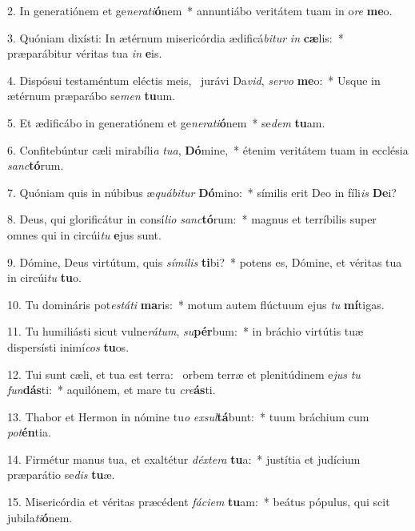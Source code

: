 2. In generatiónem et ge\textit{ne}\textit{ra}\textit{ti}\textbf{ó}nem~*  annuntiábo veritátem tuam in o\textit{re} \textbf{me}o.\

3. Quóniam dixísti: In ætérnum misericórdia ædificá\textit{bi}\textit{tur} \textit{in} \textbf{cæ}lis:~*  præparábitur véritas tua \textit{in} \textbf{e}is.\

4. Dispósui testaméntum eléctis meis, \dag\  jurávi Da\textit{vid}, \textit{ser}\textit{vo} \textbf{me}o:~*  Usque in ætérnum præparábo se\textit{men} \textbf{tu}um.\

5. Et ædificábo in generatiónem et ge\textit{ne}\textit{ra}\textit{ti}\textbf{ó}nem~*  se\textit{dem} \textbf{tu}am.\

6. Confitebúntur cæli mirabíli\textit{a} \textit{tu}\textit{a}, \textbf{Dó}mine,~*  étenim veritátem tuam in ecclésia \textit{sanc}\textbf{tó}rum.\

7. Quóniam quis in núbibus æ\textit{quá}\textit{bi}\textit{tur} \textbf{Dó}mino:~*  símilis erit Deo in fíli\textit{is} \textbf{De}i?\

8. Deus, qui glorificátur in consí\textit{li}\textit{o} \textit{sanc}\textbf{tó}rum:~*  magnus et terríbilis super omnes qui in circúi\textit{tu} \textbf{e}jus sunt.\

9. Dómine, Deus virtútum, quis \textit{sí}\textit{mi}\textit{lis} \textbf{ti}bi?~*  potens es, Dómine, et véritas tua in circúi\textit{tu} \textbf{tu}o.\

10. Tu domináris pot\textit{es}\textit{tá}\textit{ti} \textbf{ma}ris:~*  motum autem flúctuum ejus \textit{tu} \textbf{mí}tigas.\

11. Tu humiliásti sicut vulne\textit{rá}\textit{tum}, \textit{su}\textbf{pér}bum:~*  in bráchio virtútis tuæ dispersísti inimí\textit{cos} \textbf{tu}os.\

12. Tui sunt cæli, et tua est terra: \dag\  orbem terræ et plenitúdinem e\textit{jus} \textit{tu} \textit{fun}\textbf{dás}ti:~*  aquilónem, et mare tu \textit{cre}\textbf{ás}ti.\

13. Thabor et Hermon in nómine tu\textit{o} \textit{ex}\textit{sul}\textbf{tá}bunt:~*  tuum bráchium cum \textit{pot}\textbf{én}tia.\

14. Firmétur manus tua, et exaltétur \textit{déx}\textit{te}\textit{ra} \textbf{tu}a:~*  justítia et judícium præparátio se\textit{dis} \textbf{tu}æ.\

15. Misericórdia et véritas præcédent \textit{fá}\textit{ci}\textit{em} \textbf{tu}am:~*  beátus pópulus, qui scit jubila\textit{ti}\textbf{ó}nem.\


